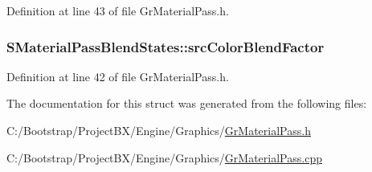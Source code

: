 Definition at line 43 of file GrMaterialPass.h.\hypertarget{struct_s_material_pass_blend_states_fb1134ab25291932ab686cf72156a571}{
\subsubsection[{srcColorBlendFactor}]{ {\bf SMaterialPassBlendStates::srcColorBlendFactor}}}
\label{struct_s_material_pass_blend_states_fb1134ab25291932ab686cf72156a571}




Definition at line 42 of file GrMaterialPass.h.

The documentation for this struct was generated from the following files:\begin{CompactItemize}
\item 
C:/Bootstrap/ProjectBX/Engine/Graphics/\hyperlink{_gr_material_pass_8h}{GrMaterialPass.h}\item 
C:/Bootstrap/ProjectBX/Engine/Graphics/\hyperlink{_gr_material_pass_8cpp}{GrMaterialPass.cpp}\end{CompactItemize}
